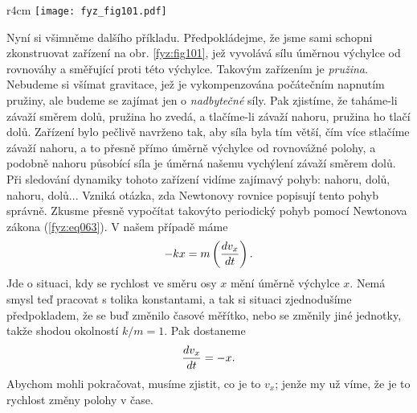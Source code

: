     \begin{wrapfigure}[12]{r}{4cm}  %
      \centering
      \texttt{[image: fyz\_fig101.pdf]}
      \caption{Závaží na pružině (\cite[s.~127]{Feynman01})}
      \label{fyz:fig101}
    \end{wrapfigure}
    Nyní si všimněme dalšího příkladu. Předpokládejme, že jsme sami schopni zkonstruovat zařízení na
    obr. \ref{fyz:fig101}, jež vyvolává sílu úměrnou výchylce od rovnováhy a směřující proti této 
    výchylce. Takovým zařízením je \emph{pružina}. Nebudeme si všímat gravitace, jež je 
    vykompenzována počátečním napnutím pružiny, ale budeme se zajímat jen o \emph{nadbytečné} síly. 
    Pak zjistíme, že taháme-li závaží směrem dolů, pružina ho zvedá, a tlačíme-li závaží nahoru, 
    pružina ho tlačí dolů. Zařízení bylo pečlivě navrženo tak, aby síla byla tím větší, čím více 
    stlačíme závaží nahoru, a to přesně přímo úměrně výchylce od rovnovážné polohy, a podobně 
    nahoru působící síla je úměrná našemu vychýlení závaží směrem dolů. Při sledování dynamiky 
    tohoto zařízení vidíme zajímavý pohyb: nahoru, dolů, nahoru, dolů... Vzniká otázka, zda 
    Newtonovy rovnice popisují tento pohyb správně. Zkusme přesně vypočítat takovýto periodický 
    pohyb pomocí Newtonova zákona (\ref{fyz:eq063}). V našem případě máme
    \begin{equation}\label{FYZ:eq128}
      -kx = m\left(\dfrac{d v_x}{d t}\right).
    \end{equation}
    Jde o situaci, kdy se rychlost ve směru osy \(x\) mění úměrně výchylce \(x\). Nemá smysl teď 
    pracovat s tolika konstantami, a tak si situaci zjednodušíme předpokladem, že se buď změnilo 
    časové měřítko, nebo se změnily jiné jednotky, takže shodou okolností \(k/m = 1\). Pak dostaneme
    \begin{equation}\label{FYZ:eq129}
      \dfrac{d v_x}{d t} = -x.
    \end{equation}
    Abychom mohli pokračovat, musíme zjistit, co je to \(v_x\); jenže my už víme, že je to rychlost 
    změny polohy v čase.
    
